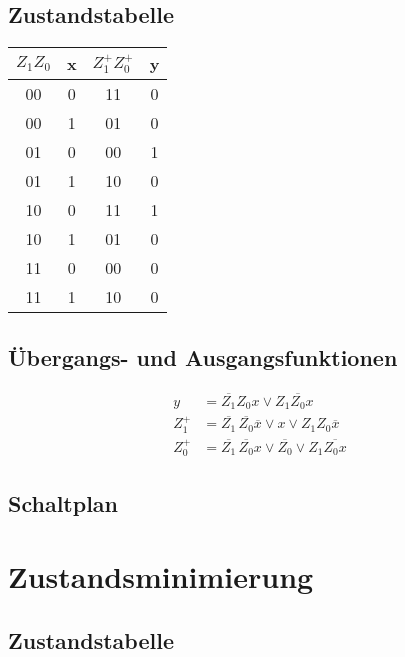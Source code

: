 \documentclass[ngerman,12pt,parskip=half]{scrartcl}
\begin{document}
\subsection{Zustandstabelle}

\begin{tabular}{cccc}  
	$Z_{1}Z_{0}$& x & $Z^+_{1}Z^+_{0}$ & y \\ \hline	
	00 & 0 & 11 & 0  \\ 
	00 & 1 & 01 & 0 \\ \hline
	01 & 0 & 00 & 1 \\
	01 & 1 & 10 & 0 \\ \hline
	10 & 0 & 11 & 1 \\
	10 & 1 & 01 & 0 \\ \hline
	11 & 0 & 00 & 0 \\
	11 & 1 & 10 & 0 \\
\end{tabular}
\vspace{0,5 cm}

\subsection{Übergangs- und Ausgangsfunktionen}

\begin{align*}
	y&=\overline{Z_{1}}Z_{0}x \lor Z_{1}\overline{Z_{0}}x \\
	Z^+_{1}&= \overline{Z_{1}}\,\overline{Z_{0}}\overline{x} \lor x \lor Z_{1}Z_0\overline{x} \\
	Z^+_{0}&=\overline{Z_{1}}\,\overline{Z_{0}}x \lor \overline{Z_{0}} \lor Z_{1}\overline{Z_{0}x}
\end{align*}

\clearpage

\subsection{Schaltplan}

\begin{center}
	
\end{center}

\clearpage

\section{Zustandsminimierung} 

\subsection{Zustandstabelle}
\end{document}

